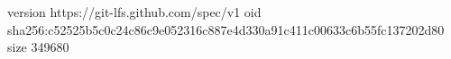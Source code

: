 version https://git-lfs.github.com/spec/v1
oid sha256:c52525b5c0c24c86c9e052316c887e4d330a91c411c00633c6b55fc137202d80
size 349680
